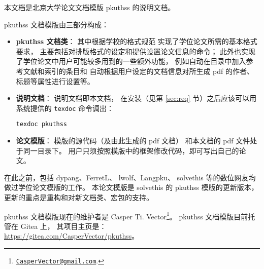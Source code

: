 %
%
%
%


本文档是北京大学论文文档模版 pkuthss 的说明文档。

pkuthss 文档模版由三部分构成：
\begin{itemize}
  \item \textbf{pkuthss 文档类}：
    其中根据学校的格式规范%
    实现了学位论文所需的基本格式要求，
    主要包括对排版格式的设定和提供设置论文信息的命令；
    此外也实现了学位论文中用户可能较多用到的一些额外功能，
    例如自动在目录中加入参考文献和索引的条目和
    自动根据用户设定的文档信息对所生成 pdf 的作者、标题等属性进行设置等。
  \item \textbf{说明文档}：
    说明文档即本文档，
    在安装（见第 \ref{sec:req} 节）之后应该可以用  系统提供的
    \verb|texdoc| 命令调出：
\begin{Verbatim}
texdoc pkuthss
\end{Verbatim}
  \item \textbf{论文模版}：
    模版的源代码（及由此生成的 pdf 文档）
    和本文档的 pdf 文件处于同一目录下。
    用户只须按照模版中的框架修改代码，即可写出自己的论文。
\end{itemize}

在此之前，包括 dypang、FerretL、%
lwolf、Langpku、%
solvethis 等的数位网友均做过学位论文模版的工作。
本论文模版是 solvethis 的 pkuthss 模版的更新版本，
更新的重点是重构和对新文档类、宏包的支持。

pkuthss 文档模版现在的维护者是 Casper Ti. Vector\footnote%
{\href{mailto:CasperVector@gmail.com}{\texttt{CasperVector@gmail.com}}.}。%
pkuthss 文档模版目前托管在 Gitea 上，
其项目主页是：\\
\hspace*{\parindent}\url{https://gitea.com/CasperVector/pkuthss}。
